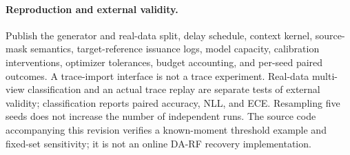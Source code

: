 \documentclass[10pt]{article}
\begin{document}
\paragraph{Reproduction and external validity.}
Publish the generator and real-data split, delay schedule, context kernel,
source-mask semantics, target-reference issuance logs, model capacity, calibration
interventions, optimizer tolerances, budget accounting, and per-seed paired
outcomes. A trace-import interface is not a trace experiment. Real-data multi-view
classification and an actual trace replay are separate tests of external validity;
classification reports paired accuracy, NLL, and ECE. Resampling five seeds
does not increase the number of independent runs. The source code accompanying
this revision verifies a known-moment threshold example and fixed-set sensitivity;
it is not an online DA-RF recovery implementation.
\end{document}
